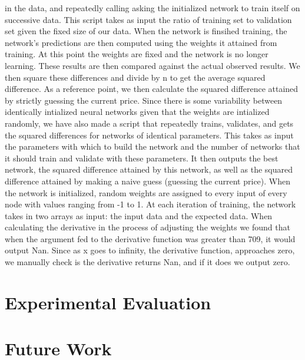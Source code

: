 \documentclass[a4paper,11pt]{article}
\begin{document}
in the data, and repeatedly calling asking the initialized network to train itself on successive data.  This script takes
as input the ratio of training set to validation set given the fixed size of our data.  When the network is finsihed training,
the network's predictions are then computed using the weights it attained from training.  At this point the weights are fixed
and the network is no longer learning.  These results are then compared against the actual observed results.  We then square these
differences and divide by n to get the average squared difference.  As a reference point, we then calculate the squared difference
attained by strictly guessing the current price.  
\newline \newline
Since there is some variability between identically intialized neural networks given that the weights are intialized randomly, 
we have also made a script that repeatedly trains, validates, and gets the squared differences for networks of identical 
parameters.  This takes as input the parameters with which to build the network and the number of networks that it should
train and validate with these parameters.  It then outputs the best network, the squared difference attained by this network,
as well as the squared difference attained by making a naive guess (guessing the current price).
\newline \newline
When the network is initialized, random weights are assigned to every input of every node with values ranging from -1 to 1.
At each iteration of training, the network takes in two arrays as input: the input data and the expected data.  When calculating
the derivative in the process of adjusting the weights we found that when the argument fed to the derivative function was
greater than 709, it would output Nan.  Since as x goes to infinity, the derivative function, approaches zero, we manually
check is the derivative returns Nan, and if it does we output zero.


\section{Experimental Evaluation}


\section{Future Work}
\end{document}
